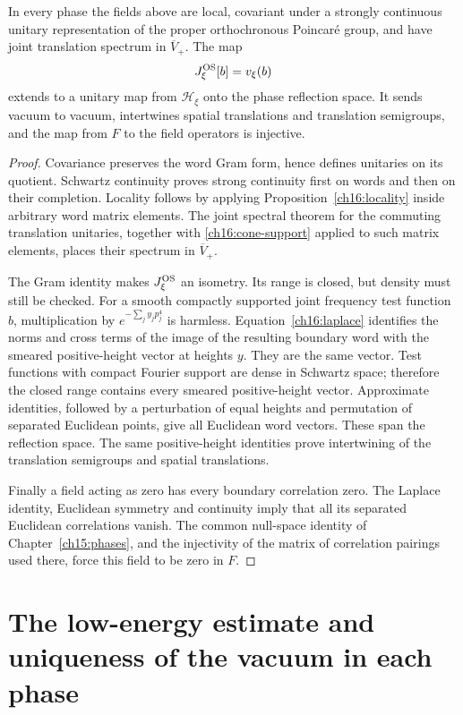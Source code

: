 \begin{theorem}
\label{ch16:fields}
In every phase the fields above are local, covariant under a strongly
continuous unitary representation of the proper orthochronous Poincar\'e
group, and have joint translation spectrum in $\overline V_+$.
The map
\[
 J_\xi^{\rm OS}[b]=v_\xi(b)
\]
extends to a unitary map from $\mathcal H_\xi$ onto the phase reflection
space. It sends vacuum to vacuum, intertwines spatial translations and
translation semigroups, and the map from $F$ to the field operators is injective.
\end{theorem}
\begin{proof}
Covariance preserves the word Gram form, hence defines unitaries on its
quotient. Schwartz continuity proves strong continuity first on words
and then on their completion. Locality follows by applying
Proposition~\ref{ch16:locality} inside arbitrary word matrix elements.
The joint spectral theorem for the commuting translation unitaries,
together with \eqref{ch16:cone-support} applied to such matrix elements,
places their spectrum in $\overline V_+$.

The Gram identity makes $J_\xi^{\rm OS}$ an isometry. Its range is closed,
but density must still be checked. For a smooth compactly supported
joint frequency test function $b$, multiplication by
$e^{-\sum_j y_jp_j^4}$ is harmless. Equation~\eqref{ch16:laplace} identifies
the norms and cross terms of the image of the resulting boundary word
with the smeared positive-height vector at heights $y$. They are the
same vector. Test functions with compact Fourier support are dense in Schwartz space;
therefore the closed range contains every smeared positive-height vector.
Approximate identities, followed by a perturbation of equal heights and
permutation of separated Euclidean points, give all Euclidean word
vectors. These span the reflection space. The same positive-height
identities prove intertwining of the translation semigroups and spatial translations.

Finally a field acting as zero has every boundary correlation zero.
The Laplace identity, Euclidean symmetry and continuity imply that all
its separated Euclidean correlations vanish. The common null-space
identity of Chapter~\ref{ch15:phases}, and the injectivity of the matrix of correlation pairings used
there, force this field to be zero in $F$.
\end{proof}

\section[Vacuum uniqueness in each phase]{The low-energy estimate and uniqueness of the vacuum in each phase}
\label{ch16:vacuum-section}

